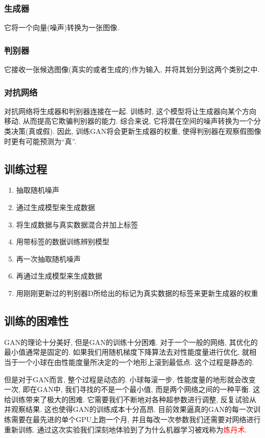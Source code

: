 \documentclass[lang=cn,11pt]{elegantpaper}
\begin{document}
\subsubsection*{生成器}
它将一个向量(噪声)转换为一张图像. 
\subsubsection*{判别器}
它接收一张候选图像(真实的或者生成的)作为输入, 并将其划分到这两个类别之中. 
\subsubsection*{对抗网络}
对抗网络将生成器和判别器连接在一起. 训练时, 这个模型将让生成器向某个方向移动, 从而提高它欺骗判别器的能力. 综合来说, 它将潜在空间的噪声转换为一个分
类决策(真或假). 因此, 训练GAN将会更新生成器的权重, 使得判别器在观察假图像时更有可能预测为“真”. 


\subsection{训练过程}
\begin{enumerate}

  \item 抽取随机噪声
  \item 通过生成模型来生成数据
  \item 将生成数据与真实数据混合并加上标签
  \item 用带标签的数据训练辨别模型
  \item 再一次抽取随机噪声
  \item 再通过生成模型来生成数据
  \item 用刚刚更新过的判别器D所给出的标记为真实数据的标签来更新生成器的权重
\end{enumerate}

\subsection{训练的困难性}

GAN的理论十分美好, 但是GAN的训练十分困难. 对于一个一般的网络, 其优化的最小值通常是固定的. 如果我们用随机梯度下降算法去对性能度量进行优化, 就相当于一个小球在由性能度量所决定的一个地形上滚到最低点. 这个过程是静态的. 

但是对于GAN而言, 整个过程是动态的. 小球每滚一步, 性能度量的地形就会改变一次, 即在GAN中, 我们寻找的不是一个最小值, 而是两个网络之间的一种平衡. 这给训练带来了极大的困难. 它需要我们不断地对各种超参数进行调整, 反复试验从并观察结果. 这也使得GAN的训练成本十分高昂. 目前效果逼真的GAN的每一次训练需要在最先进的单个GPU上跑一个月, 并且每改一次参数我们还需要对网络进行重新训练. 通过这次实验我们深刻地体验到了为什么机器学习被戏称为\textcolor{red}{炼丹术}. 
\end{document}
